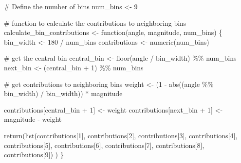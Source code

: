 \documentclass[
  letterpaper,
  DIV=11,
  numbers=noendperiod]{scrreprt}
\newenvironment{Shaded}{\begin{snugshade}}{\end{snugshade}}
\newcommand{\CommentTok}[1]{\textcolor[rgb]{0.37,0.37,0.37}{#1}}
\newcommand{\ControlFlowTok}[1]{\textcolor[rgb]{0.00,0.23,0.31}{#1}}
\newcommand{\DecValTok}[1]{\textcolor[rgb]{0.68,0.00,0.00}{#1}}
\newcommand{\FunctionTok}[1]{\textcolor[rgb]{0.28,0.35,0.67}{#1}}
\newcommand{\NormalTok}[1]{\textcolor[rgb]{0.00,0.23,0.31}{#1}}
\newcommand{\OtherTok}[1]{\textcolor[rgb]{0.00,0.23,0.31}{#1}}
\newcommand{\SpecialCharTok}[1]{\textcolor[rgb]{0.37,0.37,0.37}{#1}}
\begin{document}
\begin{Shaded}
\begin{Highlighting}[]
\CommentTok{\# Define the number of bins}
\NormalTok{num\_bins }\OtherTok{\textless{}{-}} \DecValTok{9}

\CommentTok{\# function to calculate the contributions to neighboring bins}
\NormalTok{calculate\_bin\_contributions }\OtherTok{\textless{}{-}} \ControlFlowTok{function}\NormalTok{(angle, magnitude, num\_bins) \{}
\NormalTok{  bin\_width }\OtherTok{\textless{}{-}} \DecValTok{180} \SpecialCharTok{/}\NormalTok{ num\_bins}
\NormalTok{  contributions }\OtherTok{\textless{}{-}} \FunctionTok{numeric}\NormalTok{(num\_bins)}
  
  \CommentTok{\# get the central bin}
\NormalTok{  central\_bin }\OtherTok{\textless{}{-}} \FunctionTok{floor}\NormalTok{(angle }\SpecialCharTok{/}\NormalTok{ bin\_width) }\SpecialCharTok{\%\%}\NormalTok{ num\_bins}
\NormalTok{  next\_bin }\OtherTok{\textless{}{-}}\NormalTok{ (central\_bin }\SpecialCharTok{+} \DecValTok{1}\NormalTok{) }\SpecialCharTok{\%\%}\NormalTok{ num\_bins}
  
  \CommentTok{\# get contributions to neighboring bins}
\NormalTok{  weight }\OtherTok{\textless{}{-}}\NormalTok{ (}\DecValTok{1} \SpecialCharTok{{-}} \FunctionTok{abs}\NormalTok{((angle }\SpecialCharTok{\%\%}\NormalTok{ bin\_width) }\SpecialCharTok{/}\NormalTok{ bin\_width)) }\SpecialCharTok{*}\NormalTok{ magnitude}
  
\NormalTok{  contributions[central\_bin }\SpecialCharTok{+} \DecValTok{1}\NormalTok{] }\OtherTok{\textless{}{-}}\NormalTok{ weight}
\NormalTok{  contributions[next\_bin }\SpecialCharTok{+} \DecValTok{1}\NormalTok{] }\OtherTok{\textless{}{-}}\NormalTok{ magnitude }\SpecialCharTok{{-}}\NormalTok{ weight}
  
  \FunctionTok{return}\NormalTok{(}\FunctionTok{list}\NormalTok{(contributions[}\DecValTok{1}\NormalTok{],}
\NormalTok{         contributions[}\DecValTok{2}\NormalTok{],}
\NormalTok{         contributions[}\DecValTok{3}\NormalTok{],}
\NormalTok{         contributions[}\DecValTok{4}\NormalTok{],}
\NormalTok{         contributions[}\DecValTok{5}\NormalTok{],}
\NormalTok{         contributions[}\DecValTok{6}\NormalTok{],}
\NormalTok{         contributions[}\DecValTok{7}\NormalTok{],}
\NormalTok{         contributions[}\DecValTok{8}\NormalTok{],}
\NormalTok{         contributions[}\DecValTok{9}\NormalTok{])}
\NormalTok{         )}
\NormalTok{\}}


\end{Highlighting}
\end{Shaded}
\end{document}
